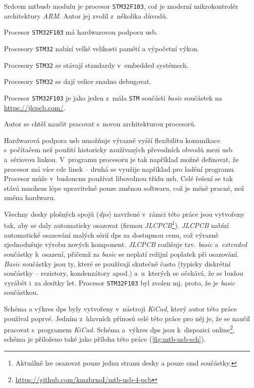 Srdcem \gls{mtbusb} modulu je procesor \texttt{STM32F103}, což je moderní
mikrokontrolér architektury \textit{ARM}. Autor jej zvolil z~několika důvodů.

\begin{compactenum}
\item Procesor \texttt{STM32F103} má hardwarovou podporu \gls{usb}.
\item Procesory \texttt{STM32} nabízí velké velikosti pamětí a výpočetní výkon.
\item Procesory \texttt{STM32} se stávají standardy v~embedded systémech.
\item Procesory \texttt{STM32} se dají velice snadno debugovat.
\item Procesor \texttt{STM32F103} je jako jeden z~mála \texttt{STM} součástí
	\textit{basic} součástek na \url{https://jlcpcb.com/}.
\item Autor se chtěl naučit pracovat s~novou architekturou procesorů.
\end{compactenum}

Hardwarová podpora \gls{usb} umožňuje výrazně vyšší flexibilitu komunikace
s~počítačem než použití historicky zaužívaných převodních obvodů mezi
\gls{usb} a~sériovou linkou. V~programu procesoru je tak například
možné definovat, že procesor má více \gls{cdc} linek – druhá se využije například
pro ladění programu. Procesor může v~budoucnu používat libovolnou třídu
\gls{usb}. Celé řešení se tak stává mnohem lépe upravitelné pouze změnou
softwaru, což je méně pracné, než změna hardwaru.

Všechny desky plošných spojů (\textit{\gls{dps}}) navržené v~rámci této práce
jsou vytvořeny tak, aby se daly automaticky osazovat (firmou
\textit{JLCPCB}\footnote{Aktuálně lze osazovat pouze jednu stranu
desky a pouze \gls{smd} součástky.}). \textit{JLCPCB} nabízí automatické osazování
malých sérií \gls{dps} za dostupnou cenu, což výrazně zjednodušuje výrobu nových
komponent. \textit{JLCPCB} rozlišuje tzv. \textit{basic} a~\textit{extended}
součástky k~osazení, přičemž za \textit{basic} se neplatí režijní poplatek při
osazování. \textit{Basic} součástky jsou ty, které se používají skutečně často
(typicky diskrétní součástky – rezistory, kondenzátory apod.) a~u~kterých se
očekává, že se budou vyrábět i~za desítky let. Procesor \texttt{STM32F103} byl
zvolen mj. proto, že je \textit{basic} součástkou.

Schéma a výkres \gls{dps} byly vytvořeny v~nástroji \textit{KiCad},
který autor této práce používal poprvé. Jedním z~hlavních přínosů celé této
práce pro něj je, že se naučil pracovat s~programem \textit{KiCad}. Schéma
a~výkres \gls{dps} jsou k~dispozici
online\footnote{\url{https://github.com/kmzbrnoI/mtb-usb-4-pcb}}, schéma je
přiloženo také jako příloha této práce (\ref{fig:mtb-usb-sch}).

